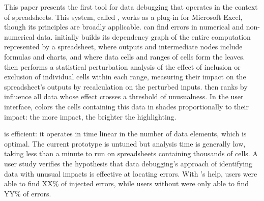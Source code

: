 This paper presents the first tool for data debugging that operates in
the context of spreadsheets. This system, called \checkcell{}, works
as a plug-in for Microsoft Excel, though its principles are broadly
applicable. \checkcell{} can find errors in numerical and
non-numerical data. \checkcell{} initially builds its dependency graph
of the entire computation represented by a spreadsheet, where outputs
and intermediate nodes include formulas and charts, and where data
cells and ranges of cells form the leaves. \checkcell{} then performs
a statistical perturbation analysis of the effect of inclusion or
exclusion of individual cells within each range, measuring their
impact on the spreadsheet's outputs by recalculation on the perturbed
inputs. \checkcell{} then ranks by influence all data whose effect
crosses a threshold of unusualness. In the user
interface, \checkcell{} colors the cells containing this data in
shades proportionally to their impact: the more impact, the brighter
the highlighting.

\checkcell{} is efficient: it operates in time linear in the number
of data elements, which is optimal. The current prototype is untuned
but analysis time is generally low, taking less than a minute to run
on spreadsheets containing thousands of cells. A user study verifies
the hypothesis that data debugging's approach of identifying data with
unusual impacts is effective at locating errors. With \checkcell{}'s
help, users were able to find XX\% of injected errors, while users
without \checkcell{} were only able to find YY\% of errors.


